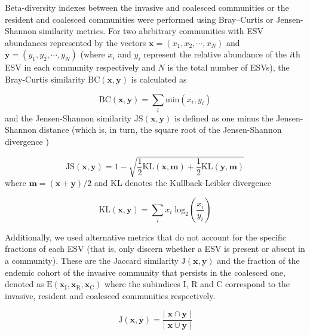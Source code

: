 \documentclass[a4paper,10pt]{article}
\begin{document}
Beta-diversity indexes between the invasive and coalesced communities
or the resident and coalesced communities were performed using Bray–Curtis or
Jensen-Shannon similarity metrics. For two abrbitrary communities with
ESV abundances represented by the vectors
$\mathbf{x} = \left( x_1, x_2, \cdots, x_N \right)$
and
$\mathbf{y} = \left( y_1, y_2, \cdots, y_N \right)$
(where $x_i$ and $y_i$ represent the relative abundance of the $i$th ESV in
each community respectively and $N$ is the total number of ESVs), the Bray-Curtis
similarity $\mathrm{BC} \left( \mathbf{x}, \mathbf{y} \right)$ is calculated as
\cite{Bray1957}

\begin{equation}
\mathrm{BC} \left( \mathbf{x}, \mathbf{y} \right) = 
\sum_i \mathrm{min} \left( x_i , y_i \right)
\label{eq:bray-curtis}
\end{equation}
%
and the Jensen-Shannon similarity
$\mathrm{JS} \left( \mathbf{x}, \mathbf{y} \right)$
is defined as one minus the Jensen-Shannon distance (which is, in turn,
the square root of the Jensen-Shannon divergence \cite{Lin1991})

\begin{equation}
\mathrm{JS} \left( \mathbf{x}, \mathbf{y} \right) = 
1 - \sqrt{\frac{1}{2}\mathrm{KL} \left( \mathbf{x}, \mathbf{m} \right) +
\frac{1}{2}\mathrm{KL} \left( \mathbf{y}, \mathbf{m} \right)}
\label{eq:jensen-shannon}
\end{equation}
%
where $\mathbf{m} = \left( \mathbf{x} + \mathbf{y} \right)/2$ and KL denotes the
Kullback-Leibler divergence \cite{Kullback1951}

\begin{equation}
\mathrm{KL} \left( \mathbf{x}, \mathbf{y} \right) = 
\sum_i x_i \; \mathrm{log_2} \left( \frac{x_i}{y_i} \right)
\label{eq:kullback-leibler}
\end{equation}

Additionally, we used alternative metrics that do not account for the specific
fractions of each ESV (that is, only discern whether a ESV is present or absent
in a community). These are the Jaccard similarity
$\mathrm{J} \left( \mathbf{x}, \mathbf{y} \right)$ \cite{Jaccard1912}
and the fraction of the endemic cohort of the invasive community
that persists in the coalesced one,
denoted as
$\mathrm{E} \left( \mathbf{x}_\mathrm{I},
\mathbf{x}_\mathrm{R},
\mathbf{x}_\mathrm{C} \right)$
where the subindices I, R and C correspond to the invasive, resident and coalesced
communities respectively.

\begin{equation}
\mathrm{J} \left( \mathbf{x}, \mathbf{y} \right) = 
\frac{\left|\; \mathbf{x} \cap \mathbf{y} \;\right|}
{\left|\; \mathbf{x} \cup \mathbf{y} \;\right|}
\label{eq:jaccard}
\end{equation}
\end{document}
